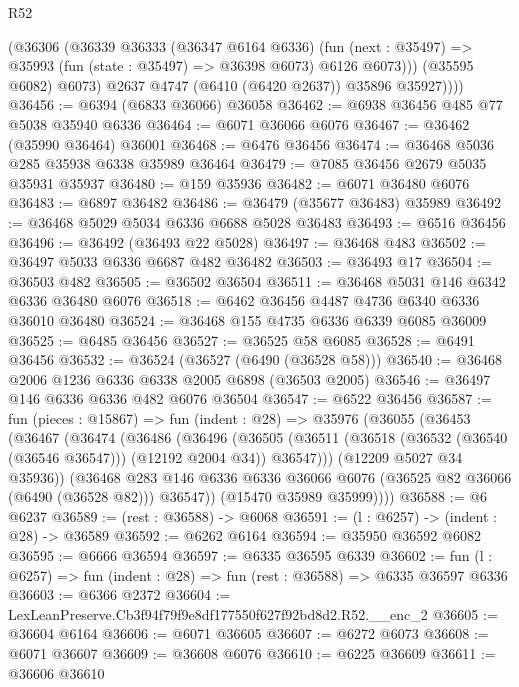 \begin{lexlean}{R52}
\begin{coremodule}
              (@36306
                (@36339
                  @36333
                  (@36347 @6164 @6336)
                  (fun (next : @35497) =>
                  @35993 (fun (state : @35497) => @36398 @6073) @6126 @6073)))
              (@35595 @6082)
              @6073)
            @2637
            @4747
            (@6410 (@6420 @2637))
            @35896
            @35927))))
@36456 := @6394 (@6833 @36066) @36058
@36462 := @6938 @36456 @485 @77 @5038 @35940 @6336
@36464 := @6071 @36066 @6076
@36467 := @36462 (@35990 @36464) @36001
@36468 := @6476 @36456
@36474 := @36468 @5036 @285 @35938 @6338 @35989 @36464
@36479 := @7085 @36456 @2679 @5035 @35931 @35937
@36480 := @159 @35936
@36482 := @6071 @36480 @6076
@36483 := @6897 @36482
@36486 := @36479 (@35677 @36483) @35989
@36492 := @36468 @5029 @5034 @6336 @6688 @5028 @36483
@36493 := @6516 @36456
@36496 := @36492 (@36493 @22 @5028)
@36497 := @36468 @483
@36502 := @36497 @5033 @6336 @6687 @482 @36482
@36503 := @36493 @17
@36504 := @36503 @482
@36505 := @36502 @36504
@36511 := @36468 @5031 @146 @6342 @6336 @36480 @6076
@36518 := @6462 @36456 @4487 @4736 @6340 @6336 @36010 @36480
@36524 := @36468 @155 @4735 @6336 @6339 @6085 @36009
@36525 := @6485 @36456
@36527 := @36525 @58 @6085
@36528 := @6491 @36456
@36532 := @36524 (@36527 (@6490 (@36528 @58)))
@36540 := @36468 @2006 @1236 @6336 @6338 @2005 @6898 (@36503 @2005)
@36546 := @36497 @146 @6336 @6336 @482 @6076 @36504
@36547 := @6522 @36456
@36587 := fun (pieces : @15867) =>
  fun (indent : @28) =>
  @35976
    (@36055
      (@36453
        (@36467
          (@36474
            (@36486
              (@36496
                (@36505
                  (@36511 (@36518 (@36532 (@36540 (@36546 @36547))) (@12192 @2004 @34)) @36547)))
              (@12209 @5027 @34 @35936))
            (@36468
              @283
              @146
              @6336
              @6336
              @36066
              @6076
              (@36525 @82 @36066 (@6490 (@36528 @82)))
              @36547))
          (@15470 @35989 @35999))))
@36588 := @6 @6237
@36589 := (rest : @36588) -> @6068
@36591 := (l : @6257) -> (indent : @28) -> @36589
@36592 := @6262 @6164
@36594 := @35950 @36592 @6082
@36595 := @6666 @36594
@36597 := @6335 @36595 @6339
@36602 := fun (l : @6257) => fun (indent : @28) => fun (rest : @36588) => @6335 @36597 @6336
@36603 := @6366 @2372
@36604 := LexLeanPreserve.Cb3f94f79f9e8df177550f627f92bd8d2.R52.__enc_2
@36605 := @36604 @6164
@36606 := @6071 @36605
@36607 := @6272 @6073
@36608 := @6071 @36607
@36609 := @36608 @6076
@36610 := @6225 @36609
@36611 := @36606 @36610

\end{coremodule}
\end{lexlean}
